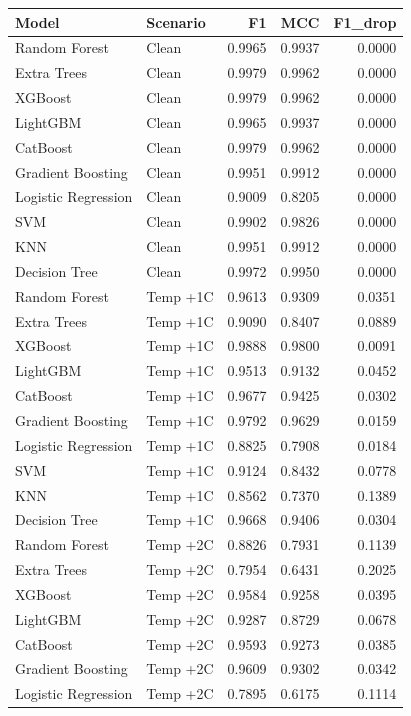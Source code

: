 \begin{tabular}{llrrr}
\toprule
Model & Scenario & F1 & MCC & F1\_drop \\
\midrule
Random Forest & Clean & 0.9965 & 0.9937 & 0.0000 \\
Extra Trees & Clean & 0.9979 & 0.9962 & 0.0000 \\
XGBoost & Clean & 0.9979 & 0.9962 & 0.0000 \\
LightGBM & Clean & 0.9965 & 0.9937 & 0.0000 \\
CatBoost & Clean & 0.9979 & 0.9962 & 0.0000 \\
Gradient Boosting & Clean & 0.9951 & 0.9912 & 0.0000 \\
Logistic Regression & Clean & 0.9009 & 0.8205 & 0.0000 \\
SVM & Clean & 0.9902 & 0.9826 & 0.0000 \\
KNN & Clean & 0.9951 & 0.9912 & 0.0000 \\
Decision Tree & Clean & 0.9972 & 0.9950 & 0.0000 \\
Random Forest & Temp +1C & 0.9613 & 0.9309 & 0.0351 \\
Extra Trees & Temp +1C & 0.9090 & 0.8407 & 0.0889 \\
XGBoost & Temp +1C & 0.9888 & 0.9800 & 0.0091 \\
LightGBM & Temp +1C & 0.9513 & 0.9132 & 0.0452 \\
CatBoost & Temp +1C & 0.9677 & 0.9425 & 0.0302 \\
Gradient Boosting & Temp +1C & 0.9792 & 0.9629 & 0.0159 \\
Logistic Regression & Temp +1C & 0.8825 & 0.7908 & 0.0184 \\
SVM & Temp +1C & 0.9124 & 0.8432 & 0.0778 \\
KNN & Temp +1C & 0.8562 & 0.7370 & 0.1389 \\
Decision Tree & Temp +1C & 0.9668 & 0.9406 & 0.0304 \\
Random Forest & Temp +2C & 0.8826 & 0.7931 & 0.1139 \\
Extra Trees & Temp +2C & 0.7954 & 0.6431 & 0.2025 \\
XGBoost & Temp +2C & 0.9584 & 0.9258 & 0.0395 \\
LightGBM & Temp +2C & 0.9287 & 0.8729 & 0.0678 \\
CatBoost & Temp +2C & 0.9593 & 0.9273 & 0.0385 \\
Gradient Boosting & Temp +2C & 0.9609 & 0.9302 & 0.0342 \\
Logistic Regression & Temp +2C & 0.7895 & 0.6175 & 0.1114 \\

\end{tabular}

